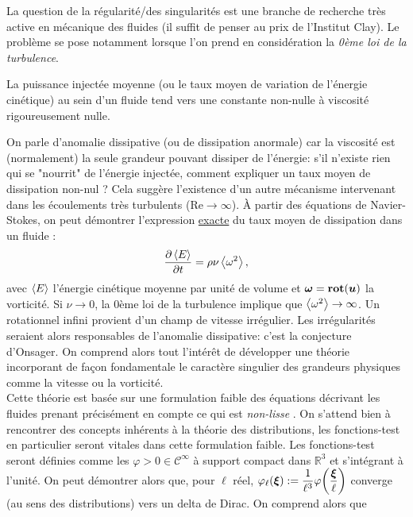 \documentclass[13pt, a4paper]{extarticle}
\begin{document}
\noindent La question de la régularité/des singularités est une branche de recherche très 
active en mécanique des fluides (il suffit de penser au prix de l'Institut Clay). Le problème 
se pose notamment lorsque l'on prend en considération la \emph{0ème loi de la turbulence}. 
\begin{tcolorbox}[colback=Goldenrod,title={Zéroième loi de la turbulence}]
		La puissance injectée moyenne (ou le taux moyen de variation de l'énergie cinétique) au sein 
    d'un fluide tend vers une constante non-nulle à viscosité rigoureusement nulle.
\end{tcolorbox}
\noindent On parle d'anomalie dissipative (ou de dissipation anormale) car la viscosité est 
(normalement) la seule grandeur pouvant dissiper de l'énergie: s'il n'existe rien qui se 
"nourrit" de l'énergie injectée, comment expliquer un taux moyen de dissipation non-nul ? 
Cela suggère l'existence d'un autre mécanisme intervenant dans les écoulements très 
turbulents ($\text{Re}\to\infty$). 
À partir des équations de Navier-Stokes, on peut démontrer l'expression \ul{exacte} 
du taux moyen de dissipation dans un fluide \cite{Galtier-Turb}:
\begin{align}
    \displaystyle\pdv{\left\langle E\right\rangle}{t} = \rho\nu\left\langle \omega^2\right\rangle,
\end{align}
avec $\left\langle E\right\rangle$ l'énergie cinétique moyenne par unité de volume et 
$\boldsymbol{\omega}=\mathbf{rot}\qty(\boldsymbol{u})$ la vorticité. Si $\nu\to 0$, la 0ème loi de la turbulence 
implique que $\left\langle \omega^2\right\rangle\to\infty$. Un rotationnel infini provient d'un champ de
 vitesse irrégulier. Les irrégularités seraient alors responsables de l'anomalie dissipative: 
 c'est la conjecture d'Onsager. On comprend alors tout l'intérêt de développer une 
 théorie incorporant de façon fondamentale le caractère singulier des grandeurs 
 physiques comme la vitesse ou la vorticité. \\
Cette théorie est basée sur une formulation faible des équations décrivant les fluides 
prenant précisément en compte ce qui est \emph{non-lisse} \cite{Dubrulle-Beyond, DuchonRobert}.
On s'attend bien à rencontrer des concepts inhérents à la théorie des distributions, 
les fonctions-test en particulier 
seront vitales dans cette formulation faible. Les fonctions-test seront définies comme 
les $\varphi>0\in\mathscr{C}^
\infty$ à support compact dans $\mathbb{R}^3$ et s'intégrant à l'unité. On peut 
démontrer alors que, pour $\ell$ réel,
$\varphi_\ell(\boldsymbol{\xi}) := \dfrac{1}{\ell^3}\varphi\qty(\dfrac{\boldsymbol{\xi}}{\ell})$ 
converge (au sens des distributions) vers un delta de Dirac. On comprend alors que 
\end{document}
